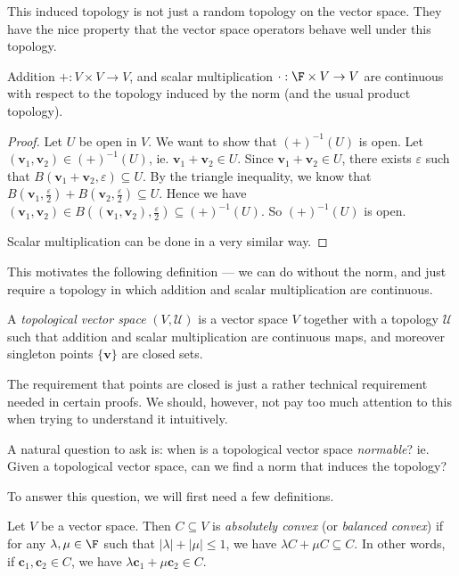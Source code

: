 \documentclass[a4paper]{article}
\begin{document}
This induced topology is not just a random topology on the vector space. They have the nice property that the vector space operators behave well under this topology.
\begin{prop}
  Addition $+: V\times V \to V$, and scalar multiplication $\cdot: \F \times V \to V$ are continuous with respect to the topology induced by the norm (and the usual product topology).
\end{prop}

\begin{proof}
  Let $U$ be open in $V$. We want to show that $(+)^{-1} (U)$ is open. Let $(\mathbf{v}_1, \mathbf{v}_2) \in (+)^{-1}(U)$, ie. $\mathbf{v}_1 + \mathbf{v}_2 \in U$. Since $\mathbf{v}_1 + \mathbf{v}_2 \in U$, there exists $\varepsilon$ such that $B(\mathbf{v}_1 + \mathbf{v}_2, \varepsilon) \subseteq U$. By the triangle inequality, we know that $B(\mathbf{v}_1, \frac{\varepsilon}{2}) + B(\mathbf{v}_2, \frac{\varepsilon}{2}) \subseteq U$. Hence we have $(\mathbf{v}_1, \mathbf{v}_2) \in B\left((\mathbf{v}_1, \mathbf{v}_2), \frac{\varepsilon}{2}\right) \subseteq (+)^{-1}(U)$. So $(+)^{-1}(U)$ is open.

  Scalar multiplication can be done in a very similar way.
\end{proof}
This motivates the following definition --- we can do without the norm, and just require a topology in which addition and scalar multiplication are continuous.
\begin{defi}
  A \emph{topological vector space} $(V, \mathcal{U})$ is a vector space $V$ together with a topology $\mathcal{U}$ such that addition and scalar multiplication are continuous maps, and moreover singleton points $\{\mathbf{v}\}$ are closed sets.
\end{defi}
The requirement that points are closed is just a rather technical requirement needed in certain proofs. We should, however, not pay too much attention to this when trying to understand it intuitively.

A natural question to ask is: when is a topological vector space \emph{normable}? ie. Given a topological vector space, can we find a norm that induces the topology?

To answer this question, we will first need a few definitions.

\begin{defi}
  Let $V$ be a vector space. Then $C\subseteq V$ is \emph{absolutely convex} (or \emph{balanced convex}) if for any $\lambda, \mu \in \F$ such that $|\lambda| + |\mu| \leq 1$, we have $\lambda C + \mu C \subseteq C$. In other words, if $\mathbf{c}_1, \mathbf{c}_2 \in C$, we have $\lambda \mathbf{c}_1 + \mu \mathbf{c}_2 \in C$.
\end{defi}
\end{document}
